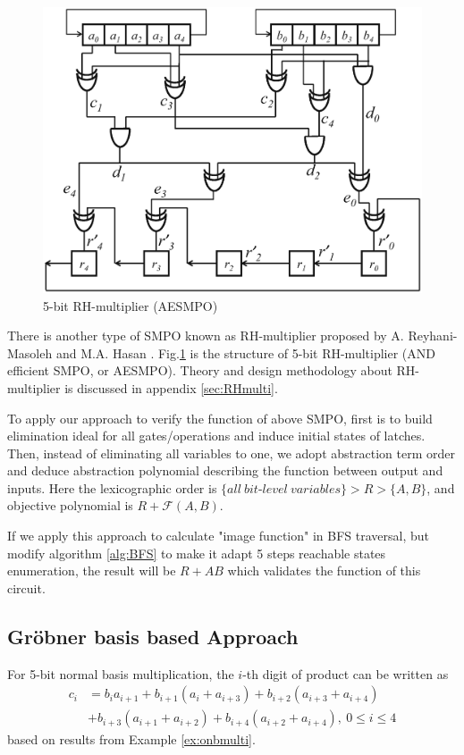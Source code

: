 \begin{figure}[hbt]
\centering
\begin{minipage}{12cm}
\includegraphics[width=4.5in]{./RH.eps}
\caption{5-bit RH-multiplier (AESMPO)}
\end{minipage}
\label{fig:RHmulti}
\end{figure}

There is another type of SMPO known as RH-multiplier proposed by A. Reyhani-Masoleh and M.A. Hasan
\cite{RHmulti}. Fig.\ref{fig:RHmulti} is the structure of 5-bit RH-multiplier (AND efficient SMPO, or AESMPO).
Theory and design methodology about RH-multiplier is discussed in appendix \ref{sec:RHmulti}.

To apply our approach to verify the function of above SMPO, first is to build elimination ideal for 
all gates/operations and induce initial states of latches. Then, instead of eliminating all variables
to one, we adopt abstraction term order and deduce abstraction polynomial describing the function 
between output and inputs.
Here the lexicographic order is $\{all\ bit$-$level\ variables\} > R > \{A, B\}$, and objective
polynomial is $R + \mathcal{F}(A, B)$.

If we apply this approach to calculate "image function" in BFS traversal, but modify algorithm
\ref{alg:BFS} to make it adapt 5 steps reachable states enumeration,
the result will be $R + AB$ which validates the function of this circuit.


\subsection{Gr\"obner basis based Approach}
\label{sec:SMPOexperiment}

For 5-bit normal basis multiplication, the $i$-th digit of product can be written as
\begin{align}
c_i &= b_ia_{i+1} + b_{i+1}(a_i + a_{i+3}) + b_{i+2}(a_{i+3} + a_{i+4}) \nonumber\\
&+ b_{i+3}(a_{i+1} + a_{i+2}) + b_{i+4}
(a_{i+2} + a_{i+4}),\ 0\leq i\leq 4 \nonumber
\end{align}
based on results from Example \ref{ex:onbmulti}.

